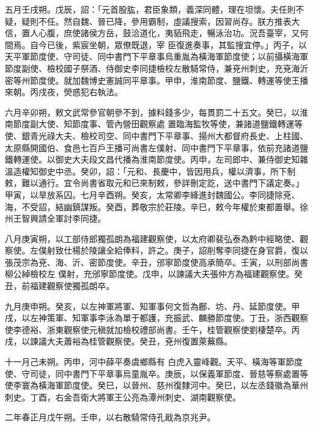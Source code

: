 \begin{pinyinscope}
 五月壬戌朔。戊辰，詔：「元首股肱，君臣象類，義深同體，理在坦懷。夫任則不疑，疑則不任。然自魏、晉已降，參用霸制，虛議搜索，因習尚存。朕方推表大信，置人心腹，庶使諸侯方岳，鼓洽道化，夷貊飛走，暢泳治功。況吾臺宰，又何間焉。自今已後，紫宸坐朝，眾僚既退，宰
 臣復進奏事，其監搜宜停。」丙子，以天平軍節度使、守司徒、同中書門下平章事烏重胤為橫海軍節度使；以前攝橫海軍節度副使、檢校國子祭酒、侍御史李同捷檢校左散騎常侍，兼兗州刺史，充兗海沂密等州節度使。就加魏博史憲誠同平章事。甲申，淮南節度、鹽鐵、轉運等使王播來朝。丙戌夜，熒惑犯右執法。



 六月辛卯朔，敕文武常參官朝參不到，據料錢多少，每貫罰二十五文。癸巳，以淮南節度副大使、知節度事、管內營田觀察處
 置臨海監牧等使，兼諸道鹽鐵轉運等使、銀青光祿大夫、檢校司空、同中書門下平章事、揚州大都督府長史、上柱國、太原縣開國伯、食邑七百戶王播可尚書左僕射、同中書門下平章事，依前充諸道鹽鐵轉運使。以御史大夫段文昌代播為淮南節度使。丙申，左司郎中、兼侍御史知雜溫造權知御史中丞。癸卯，詔：「元和、長慶中，皆因用兵，權以濟事，所下制敕，難以通行。宜令尚書省取元和已來制敕，參詳刪定訖，送中書門下議定奏。」
 甲寅，以旱放系囚。七月辛酉朔。癸亥，太常卿李絳進封魏國公。李同捷除兗、海，不受詔，結幽鎮謀叛。癸酉，葬敬宗於莊陵。辛巳，敕今年權於東都置舉。徐州王智興請全軍討李同捷。



 八月庚寅朔，以工部侍郎獨孤朗為福建觀察使，以太府卿裴弘泰為黔中經略使、觀察使。左僕射致仕楊於陵讓全給俸料，許之。庚子，詔削奪李同捷在身官爵，復以張茂宗為兗、海、沂、密節度使。辛丑，邠寧節度使高承簡卒。壬寅，以刑部尚書柳公綽檢校左
 僕射，充邠寧節度使。戊申，以諫議大夫張仲方為福建觀察使。癸丑，前福建觀察使獨孤朗卒。



 九月庚申朔。癸亥，以左神軍將軍、知軍事何文哲為鄜、坊、丹、延節度使。甲戌，以左神策軍、知軍事李泳為單于都護，充振武、麟勝節度使。丁丑，浙西觀察使李德裕、浙東觀察使元稹就加檢校禮部尚書。壬午，桂管觀察使劉棲楚卒。丙戌，以諫議大夫蕭裕為桂管觀察使。癸丑，兗州復置萊蕪縣。



 十一月己未朔。丙申，河中薛平奏虞鄉縣有
 白虎入靈峰觀。天平、橫海等軍節度使、守司徒，同中書門下平章事烏童胤卒。庚辰，以保義軍節度、晉慈等察處置等使李寰為橫海軍節度使。癸巳，以晉州、慈州復隸河中。癸巳，以左丞錢徽為華州刺史。丁酉，右金吾衛大將軍王公亮為潭州刺史、湖南觀察使。



 二年春正月戊午朔。壬申，以右散騎常侍孔戢為京兆尹。




\end{pinyinscope}
